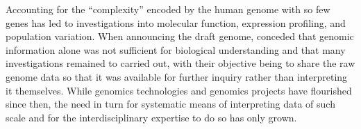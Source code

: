 Accounting for the ``complexity'' encoded by the human genome with so few genes has led to investigations into molecular function, expression profiling, and population variation. When announcing the draft genome, \citet{Lander2001} conceded that genomic information alone was not sufficient for biological understanding and that many investigations remained to carried out, with their objective being to share the raw genome data so that it was available for further inquiry rather than interpreting it themselves. While \gls{genomics} technologies and \gls{genomics} projects have flourished since then, the need in turn for systematic means of interpreting data of such scale and for the interdisciplinary expertise to do so has only grown. 


